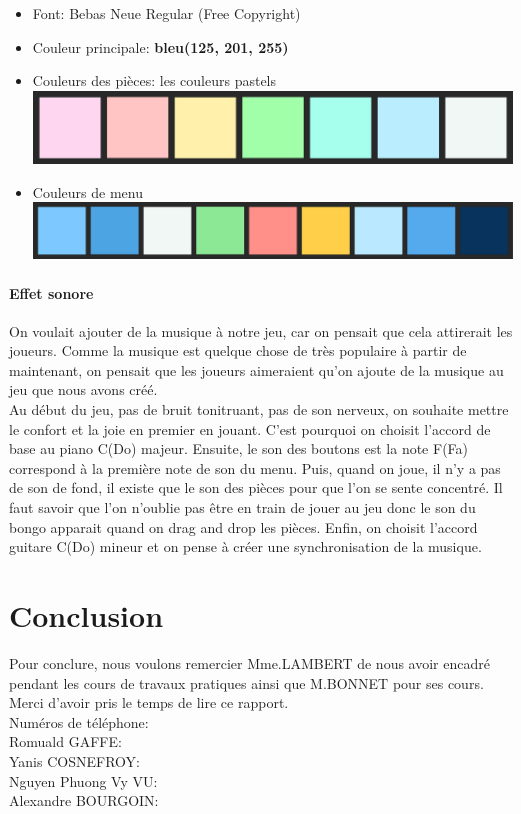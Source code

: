 \documentclass[a4paper]{report}
\begin{document}
\begin{itemize} 
    \item Font: Bebas Neue Regular (Free Copyright)
    \item Couleur principale: \textbf{bleu(125, 201, 255)}
    \item Couleurs des pièces: les couleurs pastels\\
        \includegraphics[scale=0.3]{images/palette1.png}
    \item Couleurs de menu\\
        \includegraphics[scale=0.3]{images/palette2.png}
\end{itemize}

\subsection{Effet sonore}
On voulait ajouter de la musique à notre jeu, car on pensait que cela attirerait les joueurs. 
Comme la musique est quelque chose de très populaire à partir de maintenant, on pensait que les 
joueurs aimeraient qu'on ajoute de la musique au jeu que nous avons créé.\\

Au début du jeu, pas de bruit tonitruant, pas de son nerveux, on souhaite mettre le confort et la joie en premier en jouant. C'est pourquoi on choisit l'accord de base au piano C(Do) majeur.
Ensuite, le son des boutons est la note F(Fa) correspond à la première note de son du menu.
Puis, quand on joue, il n'y a pas de son de fond, il existe que le son des pièces pour que l'on se sente concentré. Il faut savoir que l'on n'oublie pas être en train de jouer au jeu donc le son du bongo apparait quand on drag and drop les pièces.
Enfin, on choisit l'accord guitare C(Do) mineur et on pense à créer une synchronisation de la musique.


\part{Conclusion}
Pour conclure, nous voulons remercier Mme.LAMBERT de nous avoir encadré pendant les cours de travaux pratiques ainsi que M.BONNET pour ses cours. Merci d'avoir pris le temps de lire ce rapport. \\

Numéros de téléphone: \\
Romuald GAFFE: \\
Yanis COSNEFROY:\\
Nguyen Phuong Vy VU:\\
Alexandre BOURGOIN: \
\end{document}
